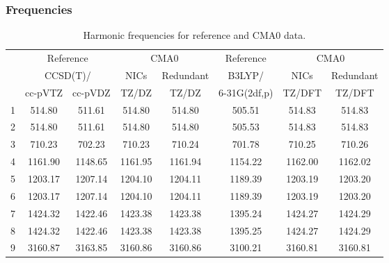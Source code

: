 \documentclass[10pt,oneside]{article}
\begin{document}
\begin{table}[h!]
\subsubsection*{Frequencies}
\centering
\caption{Harmonic frequencies for reference and CMA0 data.}
\begin{tabular}{cccccccc}
\toprule
{} & \multicolumn{2}{c}{Reference} & \multicolumn{2}{c}{CMA0} &    Reference & \multicolumn{2}{c}{CMA0} \\
{} & \multicolumn{2}{c}{CCSD(T)/} &    NICs &  Redundant &       B3LYP/ &    NICs & Redundant \\
{} &   cc-pVTZ & cc-pVDZ &   TZ/DZ &      TZ/DZ & 6-31G(2df,p) &  TZ/DFT &    TZ/DFT \\
\midrule
1 &    514.80 &  511.61 &  514.80 &     514.80 &       505.51 &  514.83 &    514.83 \\
2 &    514.80 &  511.61 &  514.80 &     514.80 &       505.53 &  514.83 &    514.83 \\
3 &    710.23 &  702.23 &  710.23 &     710.24 &       701.78 &  710.25 &    710.26 \\
4 &   1161.90 & 1148.65 & 1161.95 &    1161.94 &      1154.22 & 1162.00 &   1162.02 \\
5 &   1203.17 & 1207.14 & 1204.10 &    1204.11 &      1189.39 & 1203.19 &   1203.20 \\
6 &   1203.17 & 1207.14 & 1204.10 &    1204.11 &      1189.39 & 1203.19 &   1203.20 \\
7 &   1424.32 & 1422.46 & 1423.38 &    1423.38 &      1395.24 & 1424.27 &   1424.29 \\
8 &   1424.32 & 1422.46 & 1423.38 &    1423.38 &      1395.25 & 1424.27 &   1424.29 \\
9 &   3160.87 & 3163.85 & 3160.86 &    3160.86 &      3100.21 & 3160.81 &   3160.81 \\
\bottomrule
\end{tabular}
\end{table}
\end{document}

